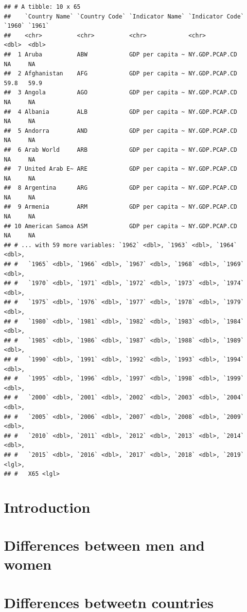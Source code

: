 \documentclass[11pt,a4paper,]{article}
\begin{document}
\begin{verbatim}
## # A tibble: 10 x 65
##    `Country Name` `Country Code` `Indicator Name` `Indicator Code` `1960` `1961`
##    <chr>          <chr>          <chr>            <chr>             <dbl>  <dbl>
##  1 Aruba          ABW            GDP per capita ~ NY.GDP.PCAP.CD     NA     NA  
##  2 Afghanistan    AFG            GDP per capita ~ NY.GDP.PCAP.CD     59.8   59.9
##  3 Angola         AGO            GDP per capita ~ NY.GDP.PCAP.CD     NA     NA  
##  4 Albania        ALB            GDP per capita ~ NY.GDP.PCAP.CD     NA     NA  
##  5 Andorra        AND            GDP per capita ~ NY.GDP.PCAP.CD     NA     NA  
##  6 Arab World     ARB            GDP per capita ~ NY.GDP.PCAP.CD     NA     NA  
##  7 United Arab E~ ARE            GDP per capita ~ NY.GDP.PCAP.CD     NA     NA  
##  8 Argentina      ARG            GDP per capita ~ NY.GDP.PCAP.CD     NA     NA  
##  9 Armenia        ARM            GDP per capita ~ NY.GDP.PCAP.CD     NA     NA  
## 10 American Samoa ASM            GDP per capita ~ NY.GDP.PCAP.CD     NA     NA  
## # ... with 59 more variables: `1962` <dbl>, `1963` <dbl>, `1964` <dbl>,
## #   `1965` <dbl>, `1966` <dbl>, `1967` <dbl>, `1968` <dbl>, `1969` <dbl>,
## #   `1970` <dbl>, `1971` <dbl>, `1972` <dbl>, `1973` <dbl>, `1974` <dbl>,
## #   `1975` <dbl>, `1976` <dbl>, `1977` <dbl>, `1978` <dbl>, `1979` <dbl>,
## #   `1980` <dbl>, `1981` <dbl>, `1982` <dbl>, `1983` <dbl>, `1984` <dbl>,
## #   `1985` <dbl>, `1986` <dbl>, `1987` <dbl>, `1988` <dbl>, `1989` <dbl>,
## #   `1990` <dbl>, `1991` <dbl>, `1992` <dbl>, `1993` <dbl>, `1994` <dbl>,
## #   `1995` <dbl>, `1996` <dbl>, `1997` <dbl>, `1998` <dbl>, `1999` <dbl>,
## #   `2000` <dbl>, `2001` <dbl>, `2002` <dbl>, `2003` <dbl>, `2004` <dbl>,
## #   `2005` <dbl>, `2006` <dbl>, `2007` <dbl>, `2008` <dbl>, `2009` <dbl>,
## #   `2010` <dbl>, `2011` <dbl>, `2012` <dbl>, `2013` <dbl>, `2014` <dbl>,
## #   `2015` <dbl>, `2016` <dbl>, `2017` <dbl>, `2018` <dbl>, `2019` <lgl>,
## #   X65 <lgl>
\end{verbatim}

\section*{Introduction}

\section*{Differences between men and women}

\section*{Differences betweetn countries}
\end{document}

